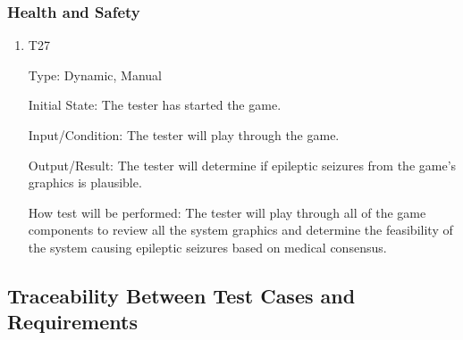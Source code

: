 \documentclass[12pt, titlepage]{article}
\begin{document}
\subsubsection{Health and Safety}

\begin{enumerate}

\item{T27}

Type: Dynamic, Manual

Initial State: The tester has started the game.

Input/Condition: The tester will play through the game.

Output/Result: The tester will determine if epileptic seizures from the game's graphics is plausible.

How test will be performed: The tester will play through all of the game components to review all the system graphics and determine the feasibility of the system causing epileptic seizures based on medical consensus.

\end{enumerate}

\subsection{Traceability Between Test Cases and Requirements}
\end{document}
